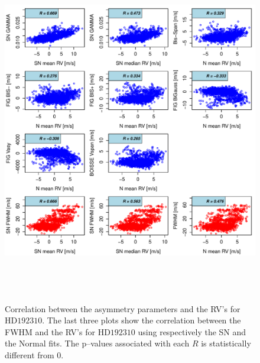 \documentclass{aa}
\begin{document}
\begin{figure}[htbp]
\begin{center}
\includegraphics[height = 6in]{HD19231_[4]Comparison_para.pdf} 
   \caption{Correlation between the asymmetry parameters and the RV's for $\text{HD}192310$. The last three plots show the correlation between the FWHM and the RV's for $\text{HD}192310$ using respectively the SN and the Normal fits. The p--values associated with each $R$ is statistically different from $0$.}
   \label{fig:Gliese785:corrPlot}
\end{center}
\end{figure}
\end{document}
